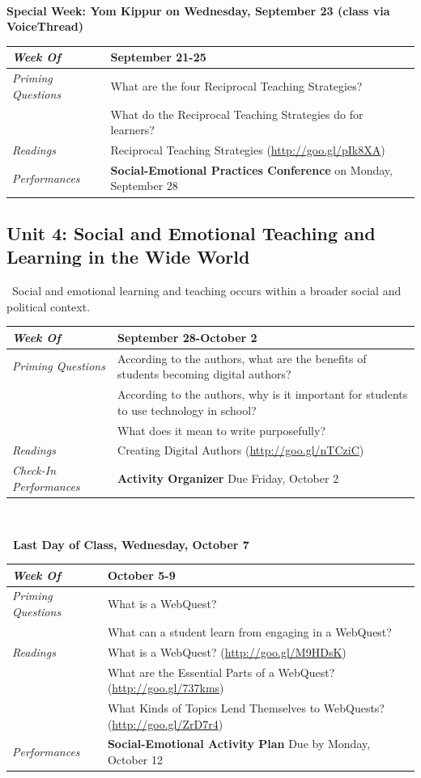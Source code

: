 \documentclass{tufte-handout}
\newcommand{\gentopic}[1]{\begin{fullwidth}\begin{center}\faKey~\textsf{#1}\end{center}\end{fullwidth}}
\newcommand{\tabpq}{\faQuestionSign\medspace\textit{Priming Questions}}
\newcommand{\tabread}{\faBook\medspace\textit{Readings}}
\newcommand{\tabperformance}{\faTasks\medspace\textit{Performances}}
\newcommand{\tabdt}{\faCalendar\medspace\textit{Week Of}}
\newcommand{\tabcheckin}{\faPagelines\medspace\textit{Check-In Performances}}
\newcommand{\tabbreak}{\begin{fullwidth}\begin{center}\faAsterisk\faAsterisk\faAsterisk\\\end{center}\end{fullwidth}}
\newcommand{\specialweek}[1]{\begin{fullwidth}\begin{center}\textbf{\faBullhorn\medspace Special Week: #1 \medspace\faBullhorn}\end{center}\end{fullwidth}}
\newenvironment{tabsched}
	{\small
	\begin{tabular}{p{1.5in}p{4.5in}}
	\midrule}
	{\midrule
	\end{tabular}
	\normalsize}
\newcommand{\weeksix}{September 21-25}
\newcommand{\weekseven}{September 28-October 2}
\newcommand{\weekeight}{October 5-9}
\newcommand{\yomkippur}{Yom Kippur on Wednesday, September 23 (class via VoiceThread)}
\newcommand{\finisemester}{\begin{fullwidth}\begin{center}\large\textbf{\faFlagCheckered~Last Day of Class, Wednesday, October 7~\faFlagCheckered}\normalsize\end{center}\end{fullwidth}}
\begin{document}
\tabbreak

\specialweek{\yomkippur}

\begin{tabsched}
	\tabdt & \weeksix \\
	\midrule
	\tabpq & What are the four Reciprocal Teaching Strategies? \\
	& What do the Reciprocal Teaching Strategies do for learners? \\
	\midrule
	\tabread & Reciprocal Teaching Strategies (\url{http://goo.gl/pIk8XA}) \\
	\midrule
	\tabperformance & \textbf{Social-Emotional Practices Conference} on Monday, September 28 \\
\end{tabsched}

\begin{fullwidth}
	\section{Unit 4: Social and Emotional Teaching and Learning in the Wide World}
\end{fullwidth}

\gentopic{Social and emotional learning and teaching occurs within a broader social and political context.}

\begin{tabsched}
	\tabdt & \weekseven \\
	\midrule
	\tabpq & According to the authors, what are the benefits of students becoming digital authors? \\
	& According to the authors, why is it important for students to use technology in school? \\
	& What does it mean to write purposefully? \\
	\midrule
	\tabread & Creating Digital Authors (\url{http://goo.gl/nTCziC}) \\
	\tabcheckin & \textbf{Activity Organizer} Due Friday, October 2 \\
\end{tabsched}

\tabbreak

\newpage

\finisemester

\begin{tabsched}
	\tabdt & \weekeight \\
	\midrule
	\tabpq & What is a WebQuest? \\
	& What can a student learn from engaging in a WebQuest? \\
	\midrule
	\tabread &  What is a WebQuest? (\url{http://goo.gl/M9HDsK}) \\
	& What are the Essential Parts of a WebQuest? (\url{http://goo.gl/737kms}) \\
	& What Kinds of Topics Lend Themselves to WebQuests? (\url{http://goo.gl/ZrD7r4}) \\
	\midrule
	\tabperformance & \textbf{Social-Emotional Activity Plan} Due by Monday, October 12 \\
\end{tabsched}
\end{document}
